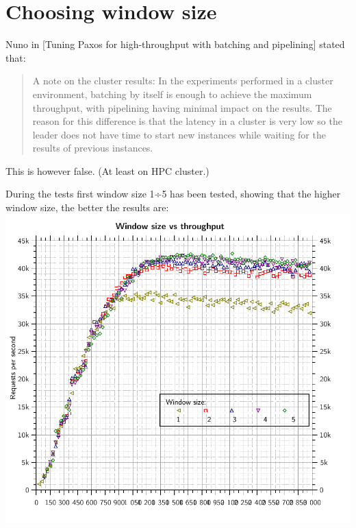 \section{Choosing window size}

Nuno in [Tuning Paxos for high-throughput with batching and pipelining] stated that:
\begin{quotation}
A note on the cluster results: In the experiments performed in a cluster environment, batching by itself is enough to achieve the maximum throughput, with pipelining having minimal impact on the results. The reason for this difference is that the latency in a cluster is very low so the leader does not have time to start new instances while waiting for the results of previous instances.
\end{quotation}
This is however false. (At least on HPC cluster.)

During the tests first window size 1÷5 has been tested, showing that the higher window size, the better the results are:\\
\includegraphics{varia/ws.pdf}

